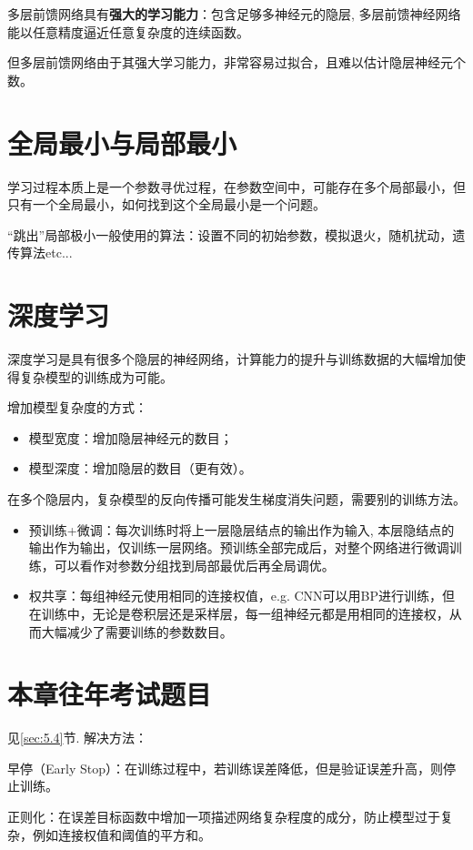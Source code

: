 多层前馈网络具有\textbf{强大的学习能力}：包含足够多神经元的隐层, 多层前馈神经网络能以任意精度逼近任意复杂度的连续函数。

但多层前馈网络由于其强大学习能力，非常容易过拟合，且难以估计隐层神经元个数。

\section{全局最小与局部最小}\label{sec:5.5}

学习过程本质上是一个参数寻优过程，在参数空间中，可能存在多个局部最小，但只有一个全局最小，如何找到这个全局最小是一个问题。

“跳出”局部极小一般使用的算法：设置不同的初始参数，模拟退火，随机扰动，遗传算法etc...

\section{深度学习}\label{sec:5.6}
深度学习是具有很多个隐层的神经网络，计算能力的提升与训练数据的大幅增加使得复杂模型的训练成为可能。

增加模型复杂度的方式：
\begin{itemize}
    \item 模型宽度：增加隐层神经元的数目；
    \item 模型深度：增加隐层的数目（更有效）。
\end{itemize}

在多个隐层内，复杂模型的反向传播可能发生梯度消失问题，需要别的训练方法。
\begin{itemize}
    \item 预训练+微调：每次训练时将上一层隐层结点的输出作为输入, 本层隐结点的输出作为输出，仅训练一层网络。预训练全部完成后，对整个网络进行微调训练，可以看作对参数分组找到局部最优后再全局调优。
    \item 权共享：每组神经元使用相同的连接权值，e.g. CNN可以用BP进行训练，但在训练中，无论是卷积层还是采样层，每一组神经元都是用相同的连接权，从而大幅减少了需要训练的参数数目。
\end{itemize}

\section{本章往年考试题目}\label{sec:5.7}

见\ref{sec:5.4}节.
解决方法：

早停（Early Stop）：在训练过程中，若训练误差降低，但是验证误差升高，则停止训练。

正则化：在误差目标函数中增加一项描述网络复杂程度的成分，防止模型过于复杂，例如连接权值和阈值的平方和。